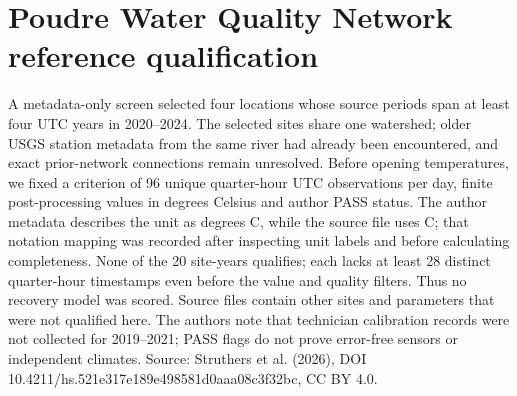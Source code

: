 \section{Poudre Water Quality Network reference qualification}
A metadata-only screen selected four locations whose source periods span at least four UTC years in 2020--2024. The selected sites share one watershed; older USGS station metadata from the same river had already been encountered, and exact prior-network connections remain unresolved. Before opening temperatures, we fixed a criterion of 96 unique quarter-hour UTC observations per day, finite post-processing values in degrees Celsius and author PASS status. The author metadata describes the unit as degrees C, while the source file uses C; that notation mapping was recorded after inspecting unit labels and before calculating completeness. None of the 20 site-years qualifies; each lacks at least 28 distinct quarter-hour timestamps even before the value and quality filters. Thus no recovery model was scored. Source files contain other sites and parameters that were not qualified here. The authors note that technician calibration records were not collected for 2019--2021; PASS flags do not prove error-free sensors or independent climates. Source: Struthers et al. (2026), DOI 10.4211/hs.521e317e189e498581d0aaa08c3f32bc, CC BY 4.0.
